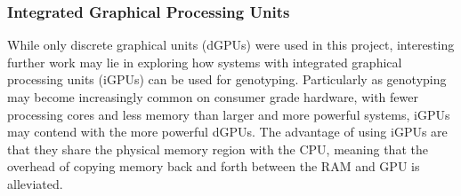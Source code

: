 \subsubsection{Integrated Graphical Processing Units}
While only discrete graphical units (dGPUs) were used in this project, interesting further work may lie in exploring how systems with integrated graphical processing units (iGPUs) can be used for genotyping.
Particularly as genotyping may become increasingly common on consumer grade hardware, with fewer processing cores and less memory than larger and more powerful systems, iGPUs may contend with the more powerful dGPUs.
The advantage of using iGPUs are that they share the physical memory region with the CPU, meaning that the overhead of copying memory back and forth between the RAM and GPU is alleviated.
